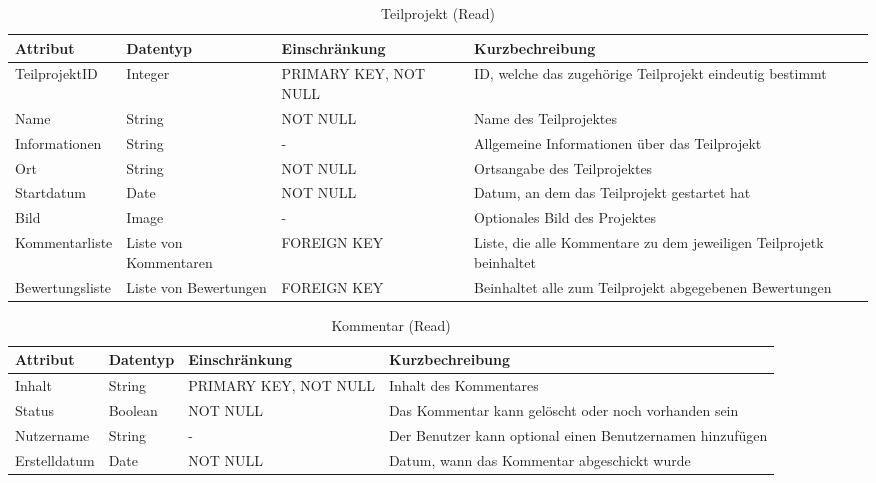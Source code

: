        \begin{table}
         \centering
         \begin{tabularx}{\textwidth}{ X | X | X | X} 
           \textbf{Attribut}  & \textbf{Datentyp} & \textbf{Einschränkung} & \textbf{Kurzbechreibung} \\ \hline \hline
           TeilprojektID      & Integer   & PRIMARY KEY, NOT NULL  
           & ID, welche das zugehörige Teilprojekt eindeutig bestimmt \\ \hline
           Name           & String    & NOT NULL               
           & Name des Teilprojektes \\ \hline
           Informationen  & String    & -
           & Allgemeine Informationen über das Teilprojekt \\ \hline
           Ort            & String    & NOT NULL 
           & Ortsangabe des Teilprojektes \\ \hline
           Startdatum     & Date      & NOT NULL
           & Datum, an dem das Teilprojekt gestartet hat \\ \hline
           Bild           & Image     & -
           & Optionales Bild des Projektes \\ \hline
           Kommentarliste & Liste von Kommentaren  & FOREIGN KEY
           & Liste, die alle Kommentare zu dem jeweiligen Teilprojetk beinhaltet \\ \hline
           Bewertungsliste & Liste von Bewertungen   & FOREIGN KEY
           & Beinhaltet alle zum Teilprojekt abgegebenen Bewertungen \\ \hline
           
           
           
           
         \end{tabularx}
            
         \caption{Teilprojekt (Read)}
    
       \end{table}

       \begin{table}
         \centering
         \begin{tabularx}{\textwidth}{ X | X | X | X} 
           \textbf{Attribut}  & \textbf{Datentyp} & \textbf{Einschränkung} & \textbf{Kurzbechreibung} \\ \hline \hline
           Inhalt      &   String   & PRIMARY KEY, NOT NULL  
           & Inhalt des Kommentares \\ \hline
           Status      & Boolean    & NOT NULL
           & Das Kommentar kann gelöscht oder noch vorhanden sein \\ \hline 
           Nutzername & String & - & Der Benutzer kann optional einen Benutzernamen hinzufügen \\ \hline
           Erstelldatum & Date & NOT NULL & Datum, wann das Kommentar abgeschickt wurde \\ \hline
         \end{tabularx}
            
         \caption{Kommentar (Read)}
    
       \end{table}

